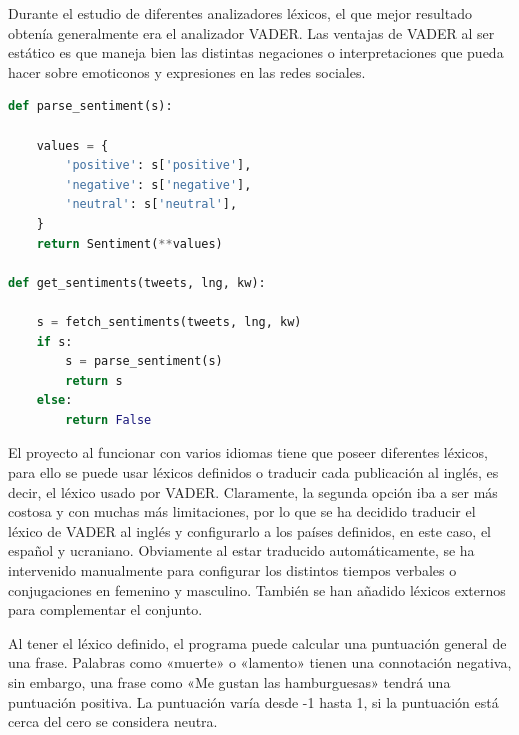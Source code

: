 Durante el estudio de diferentes analizadores léxicos, el que mejor resultado obtenía generalmente era el analizador \ac{VADER}. Las ventajas de \ac{VADER} al ser estático es que maneja bien las distintas negaciones o interpretaciones que pueda hacer sobre emoticonos y expresiones en las redes sociales. \cite{TowardsAI-vader}

\vspace{0.3cm}

\begin{lstlisting}[caption=Estructuración de los sentimientos,          label={lst:listing-python},language=Python]
def parse_sentiment(s):

    values = {
        'positive': s['positive'],
        'negative': s['negative'],
        'neutral': s['neutral'],
    }
    return Sentiment(**values)
    
def get_sentiments(tweets, lng, kw):

    s = fetch_sentiments(tweets, lng, kw)
    if s:
        s = parse_sentiment(s)
        return s
    else:
        return False
\end{lstlisting}

\vspace{0.3cm}

El proyecto al funcionar con varios idiomas tiene que poseer diferentes léxicos, para ello se puede usar léxicos definidos o traducir cada publicación al inglés, es decir, el léxico usado por \ac{VADER}. Claramente, la segunda opción iba a ser más costosa y con muchas más limitaciones, por lo que se ha decidido traducir el léxico de \ac{VADER} al inglés y configurarlo a los países definidos, en este caso, el español y ucraniano. Obviamente al estar traducido automáticamente, se ha intervenido manualmente para configurar los distintos tiempos verbales o conjugaciones en femenino y masculino. También se han añadido léxicos externos para complementar el conjunto.

\vspace{0.3cm}

Al tener el léxico definido, el programa puede calcular una puntuación general de una frase. Palabras como «muerte» o «lamento» tienen una connotación negativa, sin embargo, una frase como «Me gustan las hamburguesas» tendrá una puntuación positiva. La puntuación varía desde -1 hasta 1, si la puntuación está cerca del cero se considera neutra.

\makeatletter
\let\orig@lstnumber=\thelstnumber

\newcommand\lstsetnumber[1]{\gdef\thelstnumber{#1}}
\newcommand\lstresetnumber{\global\let\thelstnumber=\orig@lstnumber}
\makeatother

